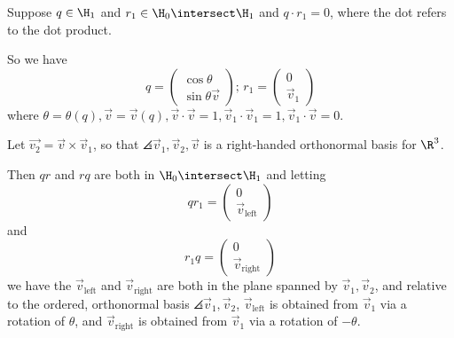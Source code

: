 \documentclass[oneside,12pt]{amsart}
\begin{document}
\begin{lemma}
\label{lemma:mult_is_rot}
Suppose $q\in\H_1$ and $r_1\in\H_0\intersect\H_1$ and $q \cdot r_1 = 0$, where the dot refers to the dot product.

So we have
$$
q = \begin{pmatrix} \cos \theta \\ \sin \theta \vec{v} \end{pmatrix}\text{; }
r_1 = \begin{pmatrix} 0 \\ \vec{v}_1 \end{pmatrix}
$$
where $\theta=\theta(q), \vec{v} = \vec{v}(q), \vec{v} \cdot \vec{v} = 1,\vec{v}_1 \cdot \vec{v}_1 = 1, \vec{v}_1 \cdot \vec{v} = 0.$


Let $\vec{v_2} = \vec{v} \times  \vec{v}_1$, so that $\angles{\vec{v}_1,\vec{v}_2,\vec{v}}$ is a right-handed orthonormal basis for $\R^3$.

Then $q r$ and $r q$ are both in $\H_0\intersect\H_1$ and letting
$$ q r_1 = \begin{pmatrix} 0 \\ \vec{v}_{\text{left}} \end{pmatrix}$$
and 
$$ r_1 q = \begin{pmatrix} 0 \\ \vec{v}_{\text{right}} \end{pmatrix}$$
we have the $\vec{v}_{\text{left}}$ and $\vec{v}_{\text{right}}$ are both in the plane spanned by $\vec{v}_1,\vec{v}_2$, and
relative to the ordered, orthonormal basis $\angles{\vec{v}_1,\vec{v}_2}$,
$\vec{v}_{\text{left}}$ is obtained from $\vec{v}_1$ via a rotation of $\theta$, and $\vec{v}_{\text{right}}$
is obtained from $\vec{v}_1$ via a rotation of $-\theta$.
\end{lemma}
\end{document}
